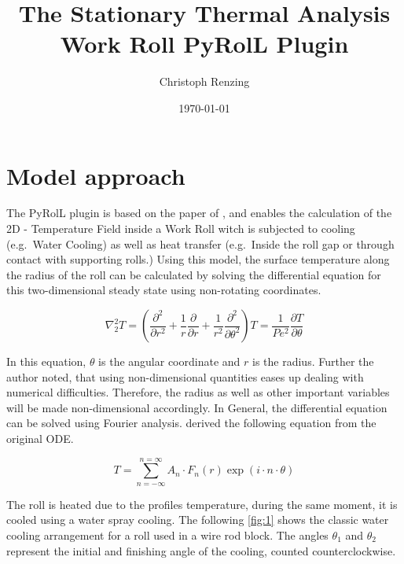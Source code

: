 \documentclass[11pt]{PyRollDocs}
\begin{document}
    \title{The Stationary Thermal Analysis Work Roll PyRolL Plugin}
    \author{Christoph Renzing}
    \date{\today}

    \maketitle


    \section{Model approach}\label{sec:model-approach}

    The PyRolL plugin is based on the paper of \textcite{Robinson1996}, and enables the calculation of the 2D - Temperature Field inside a Work Roll witch is subjected to cooling (e.g.~Water Cooling) as well as heat transfer (e.g.~Inside the roll gap or through contact with supporting rolls.)
    Using this model, the surface temperature along the radius of the roll can be calculated by solving the differential equation for this two-dimensional steady state using non-rotating coordinates.

    \begin{equation}
        \nabla_2^2 T = \left( \frac{\partial^2}{\partial r^2} + \frac{1}{r}\frac{\partial}{\partial r} + \frac{1}{r^2}\frac{\partial^2}{\partial \theta^2} \right) T = \frac{1}{Pe^2}\frac{\partial T}{\partial \theta}
        \label{eq:1}
    \end{equation}


    In this equation, $\theta$ is the angular coordinate and $r$ is the radius.
    Further the author noted, that using non-dimensional quantities eases up dealing with numerical difficulties.
    Therefore, the radius as well as other important variables will be made non-dimensional accordingly.
    In General, the differential equation can be solved using Fourier analysis.
    \textcite{Patula1981}  derived the following equation from the original ODE.


    \begin{equation}
        T = \sum_{n=-\infty}^{n=\infty} A_n \cdot F_n(r) \exp\left(i \cdot n \cdot \theta \right)
        \label{eq:2}
    \end{equation}


    The roll is heated due to the profiles temperature, during the same moment, it is cooled using a water spray cooling.
    The following \autoref{fig:1} shows the classic water cooling arrangement for a roll used in a wire rod block.
    The angles $\theta_1$ and $\theta_2$ represent the initial and finishing angle of the cooling, counted counterclockwise.
\end{document}
